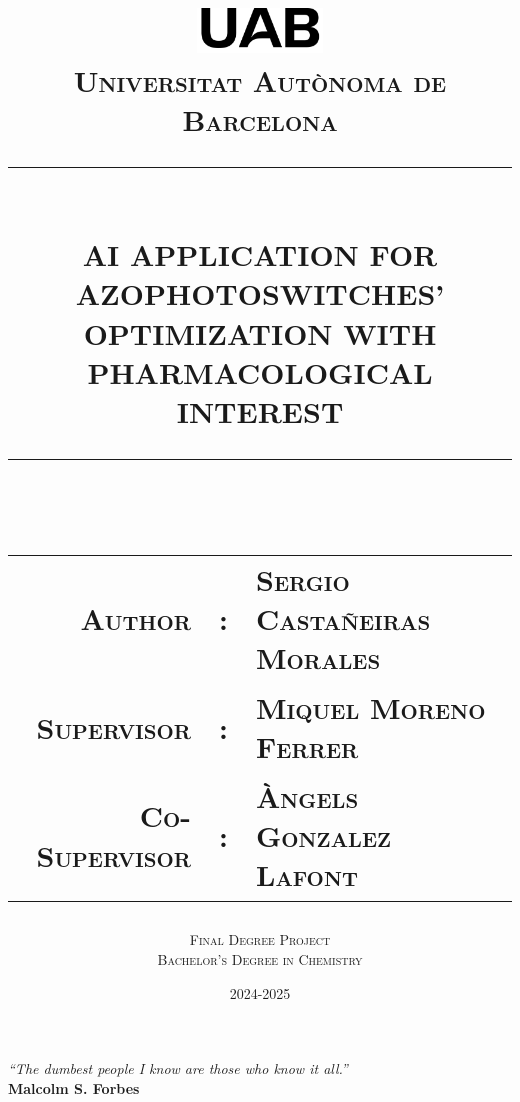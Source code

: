 \documentclass[12pt,letterpaper]{article}
\newcommand{\HRule}[1]{\rule{\linewidth}{#1}}
\newcommand\subject{Final Degree Project}
\newcommand\degree{Bachelor's Degree in Chemistry}
\newcommand\documenttitle{AI application for azophotoswitches' optimization with pharmacological interest}
\newcommand\NetIDb{Universitat Autònoma de Barcelona}
\begin{document}
\title{\vspace{4cm} \normalsize 
		\includegraphics[width = 0.25\textwidth]{GeneralSources/UABLogo.png}\\ [0.5cm]
		\textsc{\NetIDb}\\ [2.0cm]
		\HRule{0.5pt} \\
		\LARGE \textbf{\uppercase{\documenttitle}}
		\HRule{2pt} \\ [1.5cm]
		\normalsize \begin{tabular}{rcl}  %
        \textsc{Author} & : & \textsc{Sergio Castañeiras Morales} \\
        \textsc{Supervisor} & : & \textsc{Miquel Moreno Ferrer} \\
        \textsc{Co-Supervisor} & : & \textsc{Àngels Gonzalez Lafont}
    \end{tabular}
    \normalsize \vspace*{5\baselineskip}
		}

\date{2024-2025}

\author{\large \textsc{\subject} \\ \textsc{\degree}}



\begin{titlepage}
\clearpage\maketitle
\thispagestyle{empty}
\end{titlepage}

\newpage
\thispagestyle{empty}
\mbox{} 
\newpage
\thispagestyle{empty}
\vspace*{\fill} %
\begin{flushright}
    \emph{“The dumbest people I know are those who know it all.”}\\[1em]
    \textbf{Malcolm S. Forbes}
\end{flushright}
\vspace*{\fill} %
\newpage
\end{document}
